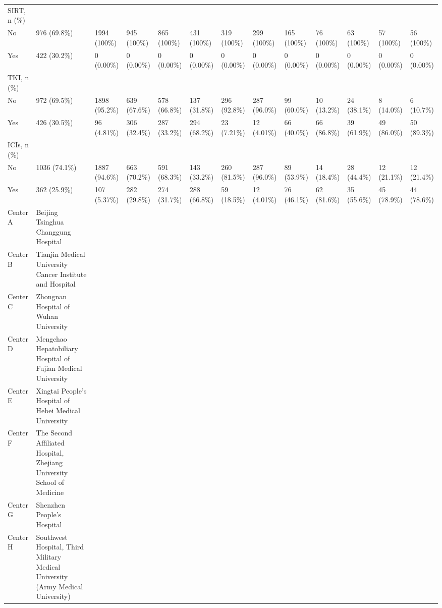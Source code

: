 \begin{landscape}
\begin{center}
\begin{longtable}{p{5.2cm}p{3.0cm}}
SIRT, n (\%) &  &  &  &  &  &  &  &  &  &  &  &  \\
No & 976 (69.8\%) & 1994 (100\%) & 945 (100\%) & 865 (100\%) & 431 (100\%) & 319 (100\%) & 299 (100\%) & 165 (100\%) & 76 (100\%) & 63 (100\%) & 57 (100\%) & 56 (100\%) \\
Yes & 422 (30.2\%) & 0 (0.00\%) & 0 (0.00\%) & 0 (0.00\%) & 0 (0.00\%) & 0 (0.00\%) & 0 (0.00\%) & 0 (0.00\%) & 0 (0.00\%) & 0 (0.00\%) & 0 (0.00\%) & 0 (0.00\%) \\
TKI, n (\%) &  &  &  &  &  &  &  &  &  &  &  &  \\
No & 972 (69.5\%) & 1898 (95.2\%) & 639 (67.6\%) & 578 (66.8\%) & 137 (31.8\%) & 296 (92.8\%) & 287 (96.0\%) & 99 (60.0\%) & 10 (13.2\%) & 24 (38.1\%) & 8 (14.0\%) & 6 (10.7\%) \\
Yes & 426 (30.5\%) & 96 (4.81\%) & 306 (32.4\%) & 287 (33.2\%) & 294 (68.2\%) & 23 (7.21\%) & 12 (4.01\%) & 66 (40.0\%) & 66 (86.8\%) & 39 (61.9\%) & 49 (86.0\%) & 50 (89.3\%) \\
ICIs, n (\%) &  &  &  &  &  &  &  &  &  &  &  &  \\
No & 1036 (74.1\%) & 1887 (94.6\%) & 663 (70.2\%) & 591 (68.3\%) & 143 (33.2\%) & 260 (81.5\%) & 287 (96.0\%) & 89 (53.9\%) & 14 (18.4\%) & 28 (44.4\%) & 12 (21.1\%) & 12 (21.4\%) \\
Yes & 362 (25.9\%) & 107 (5.37\%) & 282 (29.8\%) & 274 (31.7\%) & 288 (66.8\%) & 59 (18.5\%) & 12 (4.01\%) & 76 (46.1\%) & 62 (81.6\%) & 35 (55.6\%) & 45 (78.9\%) & 44 (78.6\%) \\
Center A & Beijing Tsinghua Changgung Hospital &  &  &  &  &  &  &  &  &  &  &  \\
Center B & Tianjin Medical University Cancer Institute and Hospital &  &  &  &  &  &  &  &  &  &  &  \\
Center C & Zhongnan Hospital of Wuhan University &  &  &  &  &  &  &  &  &  &  &  \\
Center D & Mengchao Hepatobiliary Hospital of Fujian Medical University &  &  &  &  &  &  &  &  &  &  &  \\
Center E & Xingtai People's Hospital of Hebei Medical University &  &  &  &  &  &  &  &  &  &  &  \\
Center F & The Second Affiliated Hospital, Zhejiang University School of Medicine &  &  &  &  &  &  &  &  &  &  &  \\
Center G & Shenzhen People's Hospital &  &  &  &  &  &  &  &  &  &  &  \\
Center H & Southwest Hospital, Third Military Medical University (Army Medical University) &  &  &  &  &  &  &  &  &  &  &  \\

\end{longtable}
\end{center}
\end{landscape}
